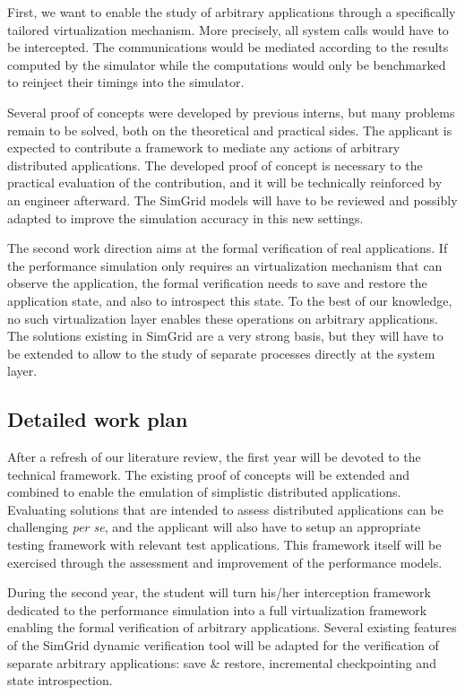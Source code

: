 \documentclass[a4paper,11pt]{article}
\begin{document}
First, we want to enable the study of arbitrary applications through a
specifically tailored virtualization mechanism. More precisely, all
system calls would have to be intercepted.  The communications would
be mediated according to the results computed by the simulator while
the computations would only be benchmarked to reinject their timings
into the simulator. 

Several proof of concepts were developed by previous interns, but many
problems remain to be solved, both on the theoretical and practical
sides. The applicant is expected to contribute a framework to mediate
any actions of arbitrary distributed applications. The developed proof
of concept is necessary to the practical evaluation of the
contribution, and it will be technically reinforced by an engineer
afterward. The SimGrid models will have to be reviewed and possibly
adapted to improve the simulation accuracy in this new settings.

The second work direction aims at the formal verification of real
applications. If the performance simulation only requires an
virtualization mechanism that can observe the application, the formal
verification needs to save and restore the application state, and also
to introspect this state.
%
To the best of our knowledge, no such virtualization layer enables
these operations on arbitrary applications. The solutions existing in
SimGrid are a very strong basis, but they will have to be extended to
allow to the study of separate processes directly at the system layer.

\subsection*{Detailed work plan}
After a refresh of our literature review, the first year will be
devoted to the technical framework. The existing proof of concepts
will be extended and combined to enable the emulation of simplistic
distributed applications. Evaluating solutions that are intended to
assess distributed applications can be challenging \textit{per se},
and the applicant will also have to setup an appropriate testing
framework with relevant test applications. This framework itself will
be exercised through the assessment and improvement of the performance
models.

During the second year, the student will turn his/her interception
framework dedicated to the performance simulation into a full
virtualization framework enabling the formal verification of arbitrary
applications. Several existing features of the SimGrid dynamic
verification tool will be adapted for the verification of separate
arbitrary applications: save \& restore, incremental checkpointing and
state introspection.
\end{document}
